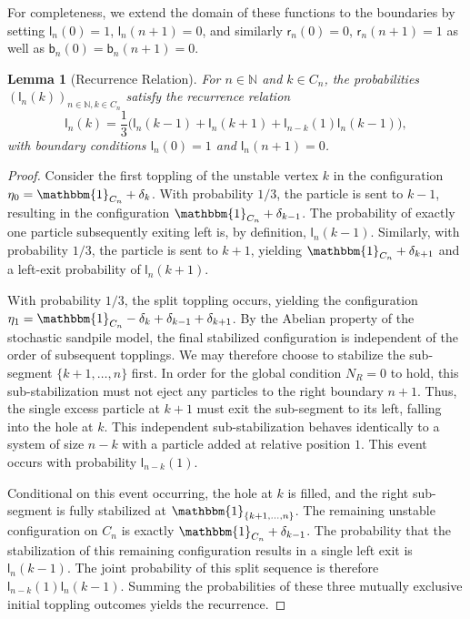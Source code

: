 \documentclass[11pt]{article}
\newtheorem{lemma}{Lemma}[section]
\newcommand{\N}{\mathbb{N}}
\newcommand{\one}{\mathbbm{1}}
\newcommand{\sgrleft}[2]{\mathsf{l}_{#1}(#2)}
\newcommand{\sgrright}[2]{\mathsf{r}_{#1}(#2)}
\newcommand{\sgrboth}[2]{\mathsf{b}_{#1}(#2)}
\begin{document}
For completeness, we extend the domain of these functions to the boundaries by setting $\sgrleft{n}{0} = 1$, $\sgrleft{n}{n+1} = 0$, and similarly $\sgrright{n}{0} = 0$, $\sgrright{n}{n+1} = 1$ as well as $\sgrboth{n}{0}=\sgrboth{n}{n+1}=0.$
\begin{lemma}[Recurrence Relation]\label{lemma:sgr-recurrence}
    For $n \in \N$ and $k \in C_n$, the probabilities $(\sgrleft{n}{k})_{n\in\N,k\in C_n}$ satisfy the recurrence relation
    \begin{equation*}\label{eq:sgr-recurrence}
        \sgrleft{n}{k} = \frac{1}{3}\bigg(\sgrleft{n}{k-1} + \sgrleft{n}{k+1} + \sgrleft{n-k}{1}\sgrleft{n}{k-1}\bigg),
    \end{equation*}
    with boundary conditions $\sgrleft{n}{0} = 1$ and $\sgrleft{n}{n+1} = 0$.
\end{lemma}

\begin{proof}
    Consider the first toppling of the unstable vertex $k$ in the configuration $\eta_0 = \one_{C_n} + \delta_k$.
    With probability $1/3$, the particle is sent to $k-1$, resulting in the configuration $\one_{C_n} + \delta_{k-1}$. The probability of exactly one particle subsequently exiting left is, by definition, $\sgrleft{n}{k-1}$.
    Similarly, with probability $1/3$, the particle is sent to $k+1$, yielding $\one_{C_n} + \delta_{k+1}$ and a left-exit probability of $\sgrleft{n}{k+1}$.
    
    With probability $1/3$, the split toppling occurs, yielding the configuration $\eta_1 = \one_{C_n} - \delta_k + \delta_{k-1} + \delta_{k+1}$. By the Abelian property of the stochastic sandpile model, the final stabilized configuration is independent of the order of subsequent topplings. We may therefore choose to stabilize the sub-segment $\{k+1, \dots, n\}$ first. 
    In order for the global condition $N_R = 0$ to hold, this sub-stabilization must not eject any particles to the right boundary $n+1$. Thus, the single excess particle at $k+1$ must exit the sub-segment to its left, falling into the hole at $k$. This independent sub-stabilization behaves identically to a system of size $n-k$ with a particle added at relative position $1$. This event occurs with probability $\sgrleft{n-k}{1}$.
    
    Conditional on this event occurring, the hole at $k$ is filled, and the right sub-segment is fully stabilized at $\one_{\{k+1, \dots, n\}}$. The remaining unstable configuration on $C_n$ is exactly $\one_{C_n} + \delta_{k-1}$. The probability that the stabilization of this remaining configuration results in a single left exit is $\sgrleft{n}{k-1}$. The joint probability of this split sequence is therefore $\sgrleft{n-k}{1}\sgrleft{n}{k-1}$. Summing the probabilities of these three mutually exclusive initial toppling outcomes yields the recurrence.
\end{proof}
\end{document}
